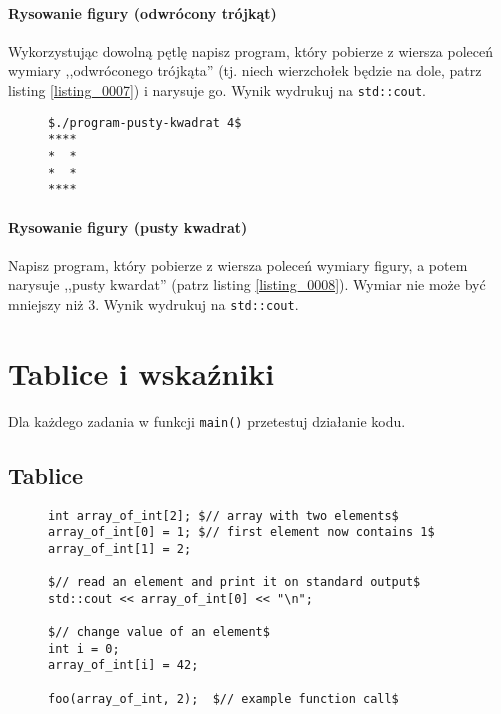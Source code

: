 \documentclass[11pt,a4paper,titlepage,onecolumn]{article}
\begin{document}
\paragraph{Rysowanie figury (odwrócony trójkąt)} Wykorzystując dowolną pętlę
napisz program, który pobierze z wiersza poleceń wymiary ,,odwróconego
trójkąta'' (tj.  niech wierzchołek będzie na dole, patrz listing
\ref{listing_0007}) i narysuje go. Wynik wydrukuj na \texttt{std::cout}.

\begin{figure}[!htp]
\begin{lstlisting}[caption={pusty kwardat},
    captionpos=b,
    label=listing_0008]
$./program-pusty-kwadrat 4$
****
*  *
*  *
****
\end{lstlisting}
\end{figure}

\paragraph{Rysowanie figury (pusty kwadrat)} Napisz program, który pobierze z
wiersza poleceń wymiary figury, a potem narysuje ,,pusty kwardat'' (patrz
listing \ref{listing_0008}). Wymiar nie może być mniejszy niż 3.
Wynik wydrukuj na \texttt{std::cout}.

\newpage
\section{Tablice i wskaźniki}

Dla każdego zadania w funkcji \texttt{main()} przetestuj działanie kodu.

\subsection{Tablice}

\begin{figure}
\begin{lstlisting}[caption={tworzenie i użycie tablicy},
    captionpos=b,
    label=listing_howto_array]
int array_of_int[2]; $// array with two elements$
array_of_int[0] = 1; $// first element now contains 1$
array_of_int[1] = 2;

$// read an element and print it on standard output$
std::cout << array_of_int[0] << "\n";

$// change value of an element$
int i = 0;
array_of_int[i] = 42;

foo(array_of_int, 2);  $// example function call$
\end{lstlisting}
\end{figure}
\end{document}
